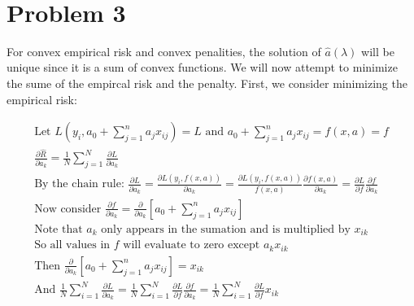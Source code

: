 \documentclass[11pt]{article}
\begin{document}
\begin{center}

\ \\
\end{center}


\section*{Problem 3}

\noindent
For convex empirical risk and convex penalities, the solution of 
$\hat{a}(\lambda)$ will be unique since it is a sum of convex functions. We 
will now attempt to minimize the sume of the empircal risk and the penalty. 
First, we consider minimizing the empirical risk:

\begin{gather*}
\text{Let } L(y_{i}, a_{0} + \sum_{j = 1}^{n} a_{j}x_{ij}) = L 
\text{ and } a_{0} + \sum_{j = 1}^{n} a_{j}x_{ij} = f(x, a) = f\\
\frac{\partial \hat{R}}{\partial a_{k}} = 
\frac{1}{N} \sum_{j = 1}^{N} \frac{\partial L}{\partial a_{k}}\\
\text{By the chain rule: } 
\frac{\partial L}{\partial a_{k}} = 
\frac{\partial L(y_{i}, f(x, a))}{\partial a_{k}} = 
\frac{\partial L(y_{i}, f(x, a))}{f(x, a)} 
\frac{\partial f(x, a)}{\partial a_{k}} = 
\frac{\partial L}{\partial f} \frac{\partial f}{\partial a_{k}}\\
\text{Now consider } 
\frac{\partial f}{\partial a_{k}} = 
\frac{\partial}{\partial a_{k}} [a_{0} + \sum_{j = 1}^{n} a_{j}x_{ij}]\\
\text{Note that } a_{k} 
\text{ only appears in the sumation and is multiplied by } x_{ik}\\
\text{So all values in } f 
\text{ will evaluate to zero except } a_{k}x_{ik}\\
\text{Then } 
\frac{\partial}{\partial a_{k}} [a_{0} + \sum_{j = 1}^{n} a_{j}x_{ij}] = x_{ik}\\
\text{And } 
\frac{1}{N} \sum_{i = 1}^{N} \frac{\partial L}{\partial a_{k}} = 
\frac{1}{N} \sum_{i = 1}^{N} \frac{\partial L}{\partial f} 
\frac{\partial f}{\partial a_{k}} = 
\frac{1}{N} \sum_{i = 1}^{N} \frac{\partial L}{\partial f} x_{ik}
\end{gather*}
\end{document}
